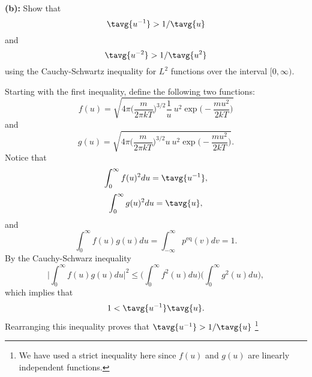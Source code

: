 \textbf{(b):} Show that
\begin{equation}
\tavg{u^{-1}} > 1/\tavg{u} \nonumber
\end{equation}
and 
\begin{equation}
\tavg{u^{-2}} > 1/\tavg{u^2} \nonumber
\end{equation}
using the Cauchy-Schwartz inequality for $L^2$ functions over the interval $[0, \infty)$.

Starting with the first inequality, define the following two functions:
\begin{equation}
f(u) = \sqrt{4\pi \bigg( \frac{m}{2\pi k T}\bigg)^{3/2} \frac{1}{u}~u^2 \exp\bigg(-\frac{m u^2}{2 k T}\bigg) } \nonumber
\end{equation}
and
\begin{equation}
g(u) = \sqrt{4\pi \bigg( \frac{m}{2\pi k T}\bigg)^{3/2} u ~u^2 \exp\bigg(-\frac{m u^2}{2 k T}\bigg) }. \nonumber
\end{equation}
Notice that
\begin{equation}
\int_{0}^{\infty} f(u)^2 du = \tavg{u^{-1}}, \nonumber
\end{equation}
\begin{equation}
\int_{0}^{\infty} g(u)^2 du  = \tavg{u}, \nonumber
\end{equation}
and
\begin{equation}
\int_{0}^{\infty} f(u)g (u)du  = \int_{-\infty}^{\infty} p^{\text{eq}}(v) dv = 1. \nonumber
\end{equation}
By the Cauchy-Schwarz inequality
\begin{equation}
\bigg|\int_{0}^{\infty} f(u) g(u) du \bigg|^2 \leq \bigg(\int_{0}^{\infty} f^2(u) du \bigg) \bigg(\int_{0}^{\infty} g^2(u) du \bigg),
\end{equation}
which implies that
\begin{equation}
1 < \tavg{u^{-1}} \tavg{u}.
\end{equation}
Rearranging this inequality proves that $\tavg{u^{-1}} > 1/\tavg{u}$ \footnote{We have used a strict inequality here since $f(u)$ and $g(u)$ are linearly independent functions.}

